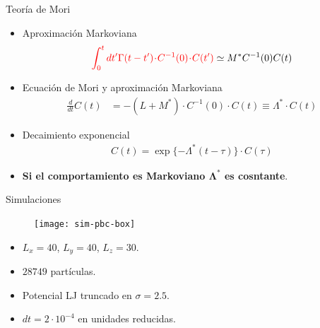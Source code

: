 \documentclass{beamer}
\newcommand{\esc}{\!\cdot\!}
\begin{document}
\begin{frame}{Teoría de Mori}
\begin{itemize}
    \item Aproximación Markoviana
  \begin{align}
{\color{red}\int_0^tdt' \Gamma(t-t')\esc C^{-1}(0)\esc  C(t')} \simeq M^* C^{-1}(0)C(t)
\nonumber
\end{align}
\item Ecuación de Mori y aproximación Markoviana
\begin{align}
  \frac{d}{dt}C(t) &= - (L+M^*)\esc C^{-1}(0)\esc C(t) 
                     \equiv \Lambda^*\esc C(t)
  \nonumber
\end{align}
\item Decaimiento exponencial
\begin{align}
  C(t)=\exp\{-\Lambda^* (t-\tau)\}\esc C(\tau)
\nonumber
\end{align}
\item {\bf Si el comportamiento es Markoviano $\boldsymbol{\Lambda^*}$ es cosntante}.
\end{itemize}
\end{frame}

\begin{frame}{Simulaciones}
  \begin{center}
  \begin{figure}
    \texttt{[image: sim-pbc-box]}
\end{figure}
    \begin{itemize}
     \item $L_{x}=40$, $L_{y}=40$, $L_{z}=30$.
     \item $28749$ partículas.
     \item Potencial LJ truncado en $\sigma=2.5$.
     \item $dt=2\cdot 10^{-4}$ en unidades reducidas. 
    \end{itemize}
  \end{center}
\end{frame}
\end{document}
